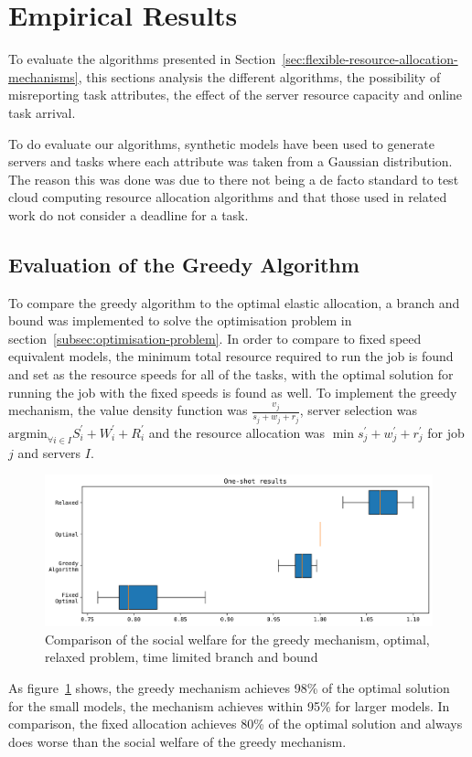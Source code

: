 \section{Empirical Results}
\label{sec:empirical-results}
To evaluate the algorithms presented in Section~\ref{sec:flexible-resource-allocation-mechanisms},
this sections analysis the different algorithms, the possibility of misreporting task attributes,
the effect of the server resource capacity and online task arrival.

To do evaluate our algorithms, synthetic models have been used to generate servers and tasks where
each attribute was taken from a Gaussian distribution. The reason this was done was due to there not
being a de facto standard to test cloud computing resource allocation algorithms and that those used
in related work do not consider a deadline for a task.

\subsection{Evaluation of the Greedy Algorithm}
\label{subsec:evaluation-of-the-greedy-algorithm}
To compare the greedy algorithm to the optimal elastic allocation, a branch and bound was implemented to solve the
optimisation problem in section~\ref{subsec:optimisation-problem}. In order to compare to fixed speed equivalent models,
the minimum total resource required to run the job is found and set as the resource speeds for all of the tasks, with
the optimal solution for running the job with the fixed speeds is found as well. To implement the greedy mechanism, the
value density function was $\frac{v_j}{s_j + w_j + r_j}$, server selection was
$\text{argmin}_{\forall i \in I} S^{'}_i + W^{'}_i + R^{'}_i$ and the resource allocation was
$\min s^{'}_j + w^{'}_j + r^{'}_j$ for job $j$ and servers $I$.

\begin{figure}
    \centering
    \includegraphics[width=\linewidth]{figs/greedy/greedy_algorithms.png}
    \caption{Comparison of the social welfare for the greedy mechanism, optimal, relaxed problem, time limited branch and bound}
    \label{fig:greedy-mechanism-comparison}
\end{figure}
As figure~\ref{fig:greedy-mechanism-comparison} shows, the greedy mechanism achieves 98\% of the optimal solution for
the small models, the mechanism achieves within 95\% for larger models. In comparison, the fixed allocation achieves
80\% of the optimal solution and always does worse than the social welfare of the greedy mechanism.

